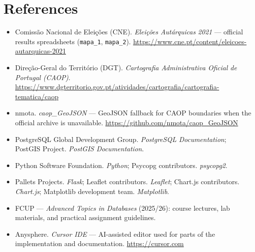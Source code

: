 \section{References}

\begin{itemize}
    \item Comiss\~{a}o Nacional de Elei\c{c}\~{o}es (CNE). \textit{Elei\c{c}\~{o}es Aut\'{a}rquicas 2021} --- official results spreadsheets (\texttt{mapa\_1}, \texttt{mapa\_2}). \url{https://www.cne.pt/content/eleicoes-autarquicas-2021}
    \item Dire\c{c}\~{a}o-Geral do Territ\'{o}rio (DGT). \textit{Cartografia Administrativa Oficial de Portugal (CAOP)}. \url{https://www.dgterritorio.gov.pt/atividades/cartografia/cartografia-tematica/caop}
    \item nmota. \textit{caop\_GeoJSON} --- GeoJSON fallback for CAOP boundaries when the official archive is unavailable. \url{https://github.com/nmota/caop_GeoJSON}
    \item PostgreSQL Global Development Group. \textit{PostgreSQL Documentation}; PostGIS Project. \textit{PostGIS Documentation}.
    \item Python Software Foundation. \textit{Python}; Psycopg contributors. \textit{psycopg2}.
    \item Pallets Projects. \textit{Flask}; Leaflet contributors. \textit{Leaflet}; Chart.js contributors. \textit{Chart.js}; Matplotlib development team. \textit{Matplotlib}.
    \item FCUP --- \textit{Advanced Topics in Databases} (2025/26): course lectures, lab materials, and practical assignment guidelines.
    \item Anysphere. \textit{Cursor IDE} --- AI-assisted editor used for parts of the implementation and documentation. \url{https://cursor.com}
\end{itemize}
